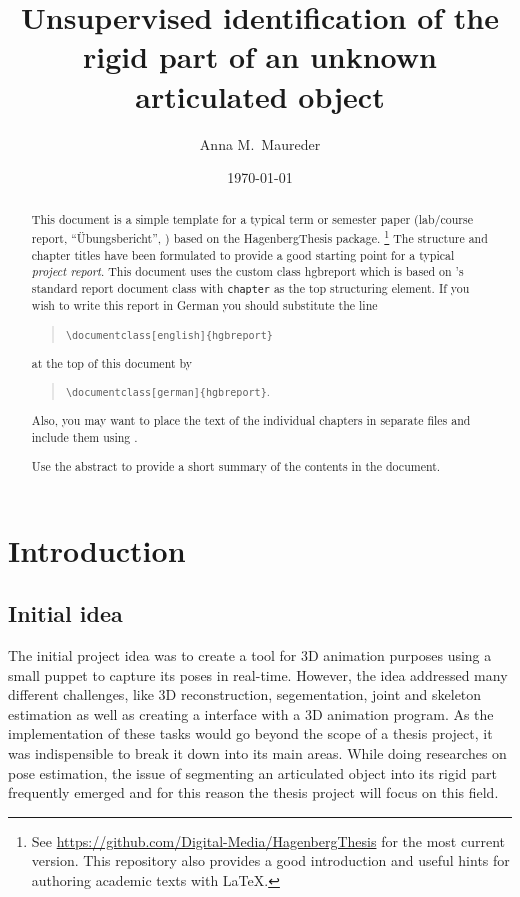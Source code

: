 \documentclass[notitlepage,english]{report}
\author{Anna M.\ Maureder}
\title{Unsupervised identification of the rigid part of an unknown articulated object}
\date{\today}
\begin{document}
\maketitle


\begin{abstract}\noindent
	This document is a simple template for a typical term or semester paper (lab/course report, 
	``Übungsbericht'', \etc) based on the \textsf{HagenbergThesis} \latex package.%
	\footnote{See \url{https://github.com/Digital-Media/HagenbergThesis} for the most current version.
		This repository also provides a good introduction and useful hints for authoring academic texts with LaTeX.}
	The structure and chapter titles have been formulated to provide a good starting point
	for a typical \emph{project report}.
	This document uses the custom class \textsf{hgbreport} which is based on \latex's standard \textsf{report} 
	document class with \texttt{chapter} as the top structuring element. 
	If you wish to write this report in German you should substitute the line
	\begin{quote}
		\verb!\documentclass[english]{hgbreport}! 
	\end{quote}
	at the top of this document by
	\begin{quote}
		\verb!\documentclass[german]{hgbreport}!.
	\end{quote}
	Also, you may want to place the text of the individual chapters in separate files and 
	include them using \verb!!.
	
	\bigskip
	\noindent
	Use the abstract to provide a short summary of the contents in the document.
\end{abstract}

\tableofcontents

\chapter {Introduction}

\section{Initial idea}

The initial project idea was to create a tool for 3D animation purposes using a small puppet to capture its poses in real-time. However, the idea addressed many different challenges, like 3D reconstruction, segementation, joint and skeleton estimation as well as creating a interface with a 3D animation program. As the implementation of these tasks would go beyond the scope of a thesis project, it was indispensible to break it down into its main areas. While doing researches on pose estimation, the issue of segmenting an articulated object into its rigid part frequently emerged and for this reason the thesis project will focus on this field.
\end{document}
